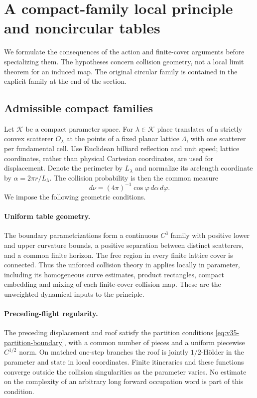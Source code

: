 \section{A compact-family local principle and noncircular tables}
\label{sec:compact-family-local-principle}
We formulate the consequences of the action and finite-cover arguments
before specializing them. The hypotheses concern collision geometry,
not a local limit theorem for an induced map. The original circular
family is contained in the explicit family at the end of the section.

\subsection{Admissible compact families}
Let $\mathcal K$ be a compact parameter space. For $\lambda\in\mathcal K$
place translates of a strictly convex scatterer $O_\lambda$ at the
points of a fixed planar lattice $\Lambda$, with one scatterer per
fundamental cell. Use Euclidean billiard reflection and unit speed;
lattice coordinates, rather than physical Cartesian coordinates, are
used for displacement. Denote the perimeter by $L_\lambda$ and
normalize its arclength coordinate by $\alpha=2\pi r/L_\lambda$.
The collision probability is then the common measure
\[
 d\nu=(4\pi)^{-1}\cos\varphi\,d\alpha\,d\varphi.
\]
We impose the following geometric conditions.

\paragraph{Uniform table geometry.}
The boundary parametrizations form a continuous $C^3$ family with
positive lower and upper curvature bounds, a positive separation
between distinct scatterers, and a common finite horizon. The free
region in every finite lattice cover is connected. Thus the unforced
collision theory in \cite{DZ11,DZ,Young} applies locally in parameter,
including its homogeneous curve estimates, product rectangles,
compact embedding and mixing of each finite-cover collision map.
These are the unweighted dynamical inputs to the principle.

\paragraph{Preceding-flight regularity.}
The preceding displacement and roof satisfy the partition conditions
\eqref{eq:v35-partition-boundary}, with a common number of pieces and
a uniform piecewise $C^{1/2}$ norm. On matched one-step branches the
roof is jointly $1/2$-H\"older in the parameter and state in local
coordinates. Finite itineraries and these functions converge outside
the collision singularities as the parameter varies. No estimate on
the complexity of an arbitrary long forward occupation word is part
of this condition.


